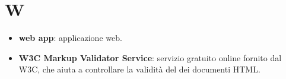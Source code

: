 \section{W}
\begin{itemize}
	\item \textbf{web app}: applicazione web.
	\item \textbf{W3C Markup Validator Service}: servizio gratuito online fornito dal W3C, che aiuta a controllare la validità del dei documenti HTML.
\end{itemize}